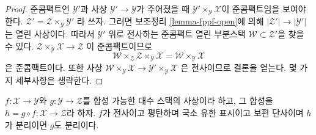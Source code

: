 \begin{proof}
준콤팩트인 $\mathcal{Y}'$과 사상 $\mathcal{Y}' \to \mathcal{Y}$가
주어졌을 때 $\mathcal{Y}' \times_\mathcal{Y} \mathcal{X}$이 준콤팩트임을
보여야 한다. $\mathcal{Z}' = \mathcal{Z} \times_\mathcal{Y} \mathcal{Y}'$
라 쓰자. 그러면 보조정리 \ref{lemma-fppf-open}에 의해
$|\mathcal{Z}'| \to |\mathcal{Y}'|$는 열린 사상이다. 따라서
$\mathcal{Y}'$ 위로 전사하는 준콤팩트 열린 부분스택
$\mathcal{W} \subset \mathcal{Z}'$을 찾을 수 있다.
$\mathcal{Z} \times_\mathcal{Y} \mathcal{X} \to \mathcal{Z}$
이 준콤팩트이므로
$$
\mathcal{W} \times_\mathcal{Z} \mathcal{Z} \times_\mathcal{Y} \mathcal{X} =
\mathcal{W} \times_\mathcal{Y} \mathcal{X}
$$
은 준콤팩트이다. 또한 사상
$\mathcal{W} \times_\mathcal{Y} \mathcal{X} \to
\mathcal{Y}' \times_\mathcal{Y} \mathcal{X}$
은 전사이므로 결론을 얻는다. 몇 가지 세부사항은 생략한다.
\end{proof}

\begin{lemma}
\label{lemma-check-separated-on-ui-cover}
$f : \mathcal{X} \to \mathcal{Y}$와 $g : \mathcal{Y} \to \mathcal{Z}$를
합성 가능한 대수 스택의 사상이라 하고, 그 합성을
$h = g \circ f : \mathcal{X} \to \mathcal{Z}$라 하자.
$f$가 전사이고 평탄하며 국소 유한 표시이고 보편 단사이며 $h$가
분리이면 $g$도 분리이다.
\end{lemma}

